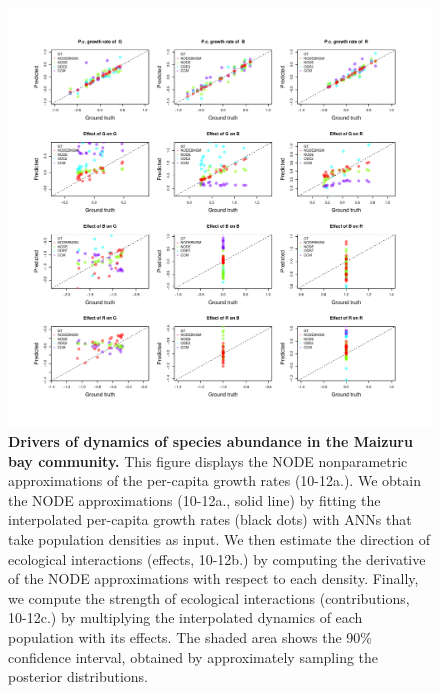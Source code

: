 \documentclass[11pt, oneside]{article}
\begin{document}
\begin{figure}[H]
\includegraphics[width=1\linewidth,page=30]{figures/figures_supplementary.pdf}
\caption{
    \textbf{Drivers of dynamics of species abundance in the Maizuru bay community.}
    This figure displays the NODE nonparametric approximations of the per-capita growth rates (10-12a.). 
    We obtain the NODE approximations (10-12a., solid line) by fitting the interpolated per-capita growth rates (black dots) with ANNs that take population densities as input. 
    We then estimate the direction of ecological interactions (effects, 10-12b.) by computing the derivative of the NODE approximations with respect to each density. 
    Finally, we compute the strength of ecological interactions (contributions, 10-12c.) by multiplying the interpolated dynamics of each population with its effects. 
    The shaded area shows the 90\% confidence interval, obtained by approximately sampling the posterior distributions.
}
\end{figure}
\newpage
\end{document}
